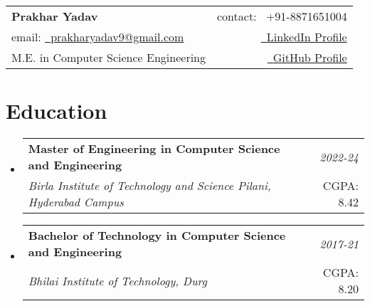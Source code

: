 \documentclass[a4paper,11pt]{article}
\makeatletter
\newcommand{\resumeSubheading}[4]{
\vspace{0.5mm}\item
    \begin{tabular*}{0.98\textwidth}[t]{l@{\extracolsep{\fill}}r}
        \textbf{#1} & \textit{\footnotesize{#4}} \\
        \textit{\footnotesize{#3}} &  \footnotesize{#2}\\
    \end{tabular*}
    \vspace{-1.3mm}
}
\newcommand{\resumeSubHeadingListStart}{\begin{itemize}[leftmargin=*,labelsep=0mm]}
\newcommand{\resumeSubHeadingListEnd}{\end{itemize}\vspace{2mm}}
\newcommand{\name}{Prakhar Yadav} %
\newcommand{\phone}{8871651004} %
\newcommand{\emaila}{prakharyadav9@gmail.com} %
\makeatother
\begin{document}
\selectfont

{
\begin{tabularx}{\linewidth}{L r} \\
  \textbf{\Large \name} & {contact: }{\raisebox{0.0\height}{\footnotesize \faPhone}\ +91-\phone}\\
  {email: }\href{mailto:\emaila}{\raisebox{0.0\height}{\footnotesize \faEnvelope}\ {\emaila}}  & \href{https://www.linkedin.com/in/prakhar-yadav}{\raisebox{0.0\height}{\footnotesize \faLinkedin}\ {LinkedIn Profile}} \\
  M.E. in Computer Science Engineering & \href{https://github.com/prakharyadav-9}{\raisebox{0.0\height}{\footnotesize \faGithub}\ {GitHub Profile}} \\  
\end{tabularx}
}

\vspace{-5.5mm}
% 
\section{\textbf{Education}}
  \resumeSubHeadingListStart
    \resumeSubheading
      {Master of Engineering in Computer Science and Engineering}{CGPA: 8.42}
      {Birla Institute of Technology and Science Pilani, Hyderabad Campus}{2022-24}
  \resumeSubHeadingListEnd
\vspace{-6.6mm}
\resumeSubHeadingListStart
    \resumeSubheading
      {Bachelor of Technology in Computer Science and Engineering}{CGPA: 8.20}
      {Bhilai Institute of Technology, Durg}{2017-21}
  \resumeSubHeadingListEnd
\vspace{-7.6mm}
\end{document}
